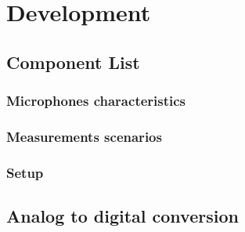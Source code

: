 \chapter{Development}\label{Development}
\section{Component List}
\subsection{Microphones characteristics}
\subsection{Measurements scenarios}
\subsection{Setup}
\section{Analog to digital conversion}



